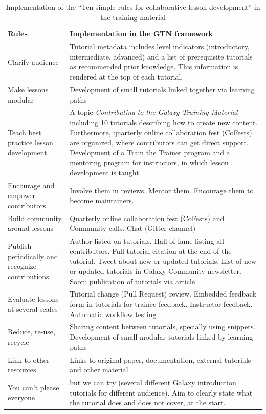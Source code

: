 \documentclass[10pt,letterpaper]{article}
\begin{document}
\begin{table}[]
	\centering
	\caption{Implementation of the ``Ten simple rules for collaborative lesson development''\cite{Devenyi_2018} in the training material
    \label{tbl:tensimplerules}}
	\begin{tabular}{p{}p{}}
		\textbf{Rules}                                      & \textbf{Implementation in the GTN framework} \\
		Clarify audience                                    & Tutorial metadata includes level indicators (introductory, intermediate, advanced) and a list of prerequisite tutorials as recommended prior knowledge. This information is rendered at the top of each tutorial. \\
		Make lessons modular                                & Development of small tutorials linked together via learning paths \\
		Teach best practice lesson development              & A topic \emph{Contributing to the Galaxy Training Material} including 10 tutorials describing how to create new content. Furthermore, quarterly online collaboration fest (CoFests) are organized, where contributors can get direct support. Development of a Train the Trainer program and a mentoring program for instructors, in which lesson development is taught \\
		Encourage and empower contributors                  & Involve them in reviews. Mentor them. Encourage them to become maintainers. \\
		Build community around lessons                      & Quarterly online collaboration fest (CoFests) and Community calls. Chat (Gitter channel) \\
		Publish periodically and recognize contributions    & Author listed on tutorials. Hall of fame listing all contributors. Full tutorial citation at the end of the tutorial. Tweet about new or updated tutorials. List of new or updated tutorials in Galaxy Community newsletter. Soon: publication of tutorials via article \\
		Evaluate lessons at several scales                  & Tutorial change (Pull Request) review. Embedded feedback form in tutorials for trainee feedback. Instructor feedback. Automatic workflow testing \\
		Reduce, re-use, recycle                             & Sharing content between tutorials, specially using snippets. Development of small modular tutorials linked by learning paths \\
		Link to other resources                             & Links to original paper, documentation, external tutorials and other material \\
		You can't please everyone                           & but we can try (several different Galaxy introduction tutorials for different audience). Aim to clearly state what the tutorial does and does not cover, at the start.  \\
	\end{tabular}
\end{table}
\end{document}
